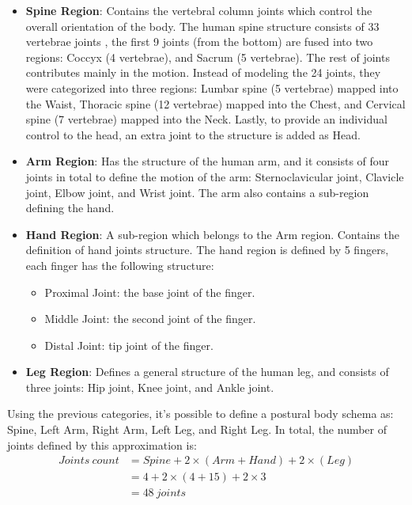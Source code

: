 \begin{itemize}
\item \textbf{Spine Region}: Contains the vertebral column joints which control the overall orientation of the body. The human spine structure consists of 33 vertebrae joints \cite{drakemitchell}, the first 9 joints (from the bottom) are fused into two regions: Coccyx (4 vertebrae), and Sacrum (5 vertebrae). The rest of joints contributes mainly in the motion. Instead of modeling the 24 joints, they were categorized into three regions: Lumbar spine (5 vertebrae) mapped into the Waist, Thoracic spine (12 vertebrae) mapped into the Chest, and Cervical spine (7 vertebrae) mapped into the Neck. Lastly, to provide an individual control to the head, an extra joint to the structure is added as Head.

\item \textbf{Arm Region}: Has the structure of the human arm, and it consists of four joints in total to define the motion of the arm: Sternoclavicular joint, Clavicle joint, Elbow joint, and Wrist joint. The arm also contains a sub-region defining the hand.

\item \textbf{Hand Region}: A sub-region which belongs to the Arm region. Contains the definition of hand joints structure. The hand region is defined by 5 fingers, each finger has the following structure:
\begin{itemize}
  \setlength\itemsep{0em}
\item Proximal Joint: the base joint of the finger.
\item Middle Joint: the second joint of the finger.
\item Distal Joint: tip joint of the finger.
\end{itemize}

\item \textbf{Leg Region}: Defines a general structure of the human leg, and consists of three joints: Hip joint, Knee joint, and Ankle joint.
\end{itemize}


Using the previous categories, it's possible to define a postural body schema as: Spine, Left Arm, Right Arm, Left Leg, and Right Leg. In total, the number of joints defined by this approximation is: 
\begin{equation}
\begin{split}
Joints\ count &=Spine + 2\times (Arm+Hand)+2\times(Leg) \\
&=4 + 2\times(4+15)+2\times3\\
&=48\ joints
\end{split}
\end{equation}

